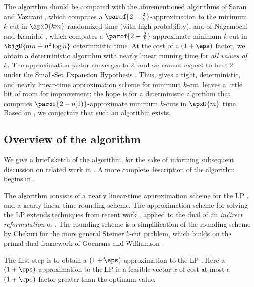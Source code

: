 \documentclass{toc}
\begin{document}
The algorithm should be compared with the aforementioned algorithms of
Saran and Vazirani \cite{sv-95}, which computes a
$\parof{2 - \frac{2}{k}}$-approximation to the minimum $k$-cut in
$\apxO{k m}$ randomized time (with high probability), and of Nagamochi
and Kamidoi \cite{nk}, which computes a
$\parof{2- \frac{2}{k}}$-approximate minimum $k$-cut in
\begin{math}
  \bigO{mn + n^2 \log n}
\end{math}
deterministic time. At the cost of a
%
$(1+\eps)$  %
factor,
we obtain a deterministic algorithm with nearly linear running time
for \emph{all values of $k$.} The approximation factor converges to
$2$, and we cannot expect to beat 2 under the
%
Small-Set Expansion Hypothesis   %
\cite{manurangsi-17}. Thus,  gives a
tight, deterministic, and
%
nearly linear-time %
approximation scheme for
minimum  %
$k$-cut.  leaves a little bit of room for
improvement: the hope is for a deterministic algorithm that computes
$\parof{2 - o(1)}$-approximate minimum $k$-cuts in $\apxO{m}$
time. Based on , we conjecture that such an
algorithm exists.

\subsection{Overview of the algorithm}

We give a brief sketch of the algorithm, for the sake of informing
subsequent discussion on related work in . A
more complete description of the algorithm begins
%
%
in .

The algorithm consists of a nearly %
linear-time  %
approximation scheme
for the LP , and a nearly %
linear-time  %
rounding
scheme. The approximation scheme for solving the LP extends techniques
from recent work \cite{cq-17-soda}, applied to the dual of an
\emph{indirect reformulation} of . The rounding scheme
is a simplification of the rounding scheme by Chekuri \etal \cite{cgn-06}
for the more general Steiner $k$-cut problem, which builds on the
primal-dual framework of Goemans and Williamson \cite{gw-95}.

The first step is to obtain a
%
$(1+\eps)$-approximation
to the LP . Here a
%
$(1+\eps)$-approximation
to the LP  is a feasible vector $x$ of
cost at most a %
$(1+\eps)$  %
factor greater than the
optimum value.
\end{document}
